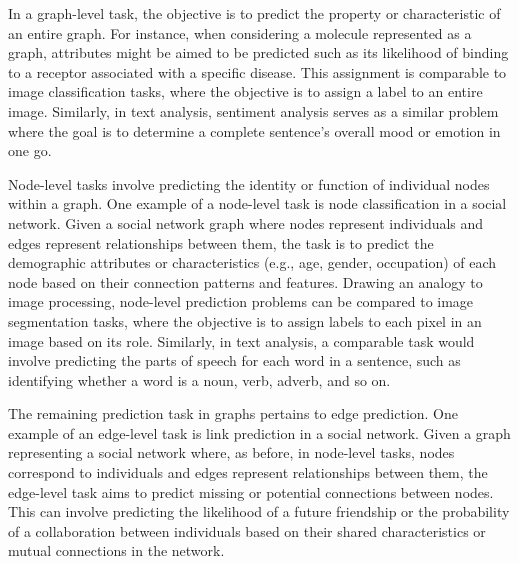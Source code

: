 In a graph-level task, the objective is to predict the property or characteristic of an entire graph.
For instance, when considering a molecule represented as a graph, attributes might be aimed to be predicted such as its likelihood of binding to a receptor associated with a specific disease.
This assignment is comparable to image classification tasks, where the objective is to assign a label to an entire image.
Similarly, in text analysis, sentiment analysis serves as a similar problem where the goal is to determine a complete sentence's overall mood or emotion in one go.

Node-level tasks involve predicting the identity or function of individual nodes within a graph.
One example of a node-level task is node classification in a social network.
Given a social network graph where nodes represent individuals and edges represent relationships between them, the task is to predict the demographic attributes or characteristics (e.g., age, gender, occupation) of each node based on their connection patterns and features.
Drawing an analogy to image processing, node-level prediction problems can be compared to image segmentation tasks, where the objective is to assign labels to each pixel in an image based on its role.
Similarly, in text analysis, a comparable task would involve predicting the parts of speech for each word in a sentence, such as identifying whether a word is a noun, verb, adverb, and so on.

The remaining prediction task in graphs pertains to edge prediction.
One example of an edge-level task is link prediction in a social network.
Given a graph representing a social network where, as before, in node-level tasks, nodes correspond to individuals and edges represent relationships between them, the edge-level task aims to predict missing or potential connections between nodes.
This can involve predicting the likelihood of a future friendship or the probability of a collaboration between individuals based on their shared characteristics or mutual connections in the network.

